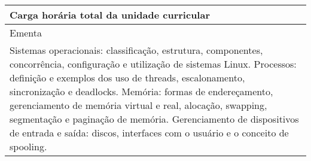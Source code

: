 \begin{quadro}[ht!]
\begin{tabular}{|p{3cm} p{2cm} p{3cm} p{2cm} p{3cm} p{2cm}|}
\multicolumn{5}{|p{13cm}|}{\cellcolor{blue1} Carga horária total da unidade curricular} & \multicolumn{1}{p{1cm}|}{\raggedleft 60	}\\\hline
\multicolumn{6}{|p{15cm}|}{\cellcolor{blue1} Ementa} \\\hline
\hline\multicolumn{6}{|p{15cm}|}{\scriptsize Sistemas operacionais: classificação, estrutura, componentes, concorrência, configuração e utilização de sistemas Linux. Processos: definição e exemplos dos uso de threads, escalonamento, sincronização e deadlocks. Memória: formas de endereçamento, gerenciamento de memória virtual e real, alocação, swapping, segmentação e paginação de memória. Gerenciamento de dispositivos de entrada e saída: discos, interfaces com o usuário e o conceito de spooling.}\\\hline
\hline
	\end{tabular}
\end{quadro}
